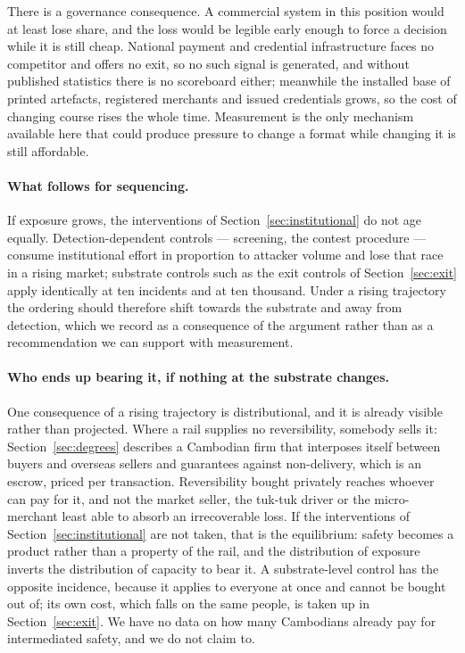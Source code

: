 \documentclass[10pt,a4paper,twocolumn]{article}
\begin{document}
There is a governance consequence. A commercial system in this position would
at least lose share, and the loss would be legible early enough to force a
decision while it is still cheap. National payment and credential
infrastructure faces no competitor and offers no exit, so no such signal is
generated, and without published statistics there is no scoreboard either;
meanwhile the installed base of printed artefacts, registered merchants and
issued credentials grows, so the cost of changing course rises the whole time.
Measurement is the only mechanism available here that could produce pressure
to change a format while changing it is still affordable.

\paragraph{What follows for sequencing.} If exposure grows, the interventions
of Section~\ref{sec:institutional} do not age equally. Detection-dependent
controls --- screening, the contest procedure --- consume institutional effort
in proportion to attacker volume and lose that race in a rising market;
substrate controls such as the exit controls of Section~\ref{sec:exit} apply
identically at ten incidents and at ten thousand. Under a rising trajectory the
ordering should therefore shift towards the substrate and away from detection,
which we record as a consequence of the argument rather than as a
recommendation we can support with measurement.

\paragraph{Who ends up bearing it, if nothing at the substrate changes.}
One consequence of a rising trajectory is distributional, and it is already
visible rather than projected. Where a rail supplies no reversibility, somebody
sells it: Section~\ref{sec:degrees} describes a Cambodian firm that interposes
itself between buyers and overseas sellers and guarantees against non-delivery,
which is an escrow, priced per transaction. Reversibility bought privately
reaches whoever can pay for it, and not the market seller, the tuk-tuk driver or
the micro-merchant least able to absorb an irrecoverable loss. If the
interventions of Section~\ref{sec:institutional} are not taken, that is the
equilibrium: safety becomes a product rather than a property of the rail, and
the distribution of exposure inverts the distribution of capacity to bear it. A
substrate-level control has the opposite incidence, because it applies to
everyone at once and cannot be bought out of; its own cost, which falls on the
same people, is taken up in Section~\ref{sec:exit}. We have no data on how many
Cambodians already pay for intermediated safety, and we do not claim to.
\end{document}
